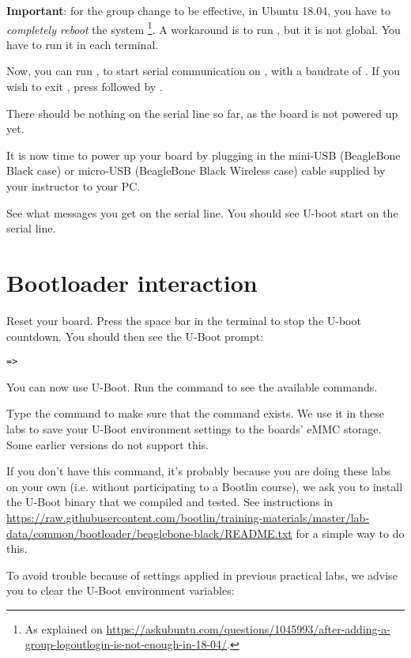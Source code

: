 {\bf Important}: for the group change to be effective, in Ubuntu 18.04, you have to
{\em completely reboot} the system \footnote{As explained on
\url{https://askubuntu.com/questions/1045993/after-adding-a-group-logoutlogin-is-not-enough-in-18-04/}.}.
A workaround is to run , but it is not global.
You have to run it in each terminal.

Now, you can run , to start serial
communication on , with a baudrate of . If
you wish to exit , press \code{[Ctrl][a]} followed by
\code{[Ctrl][x]}.

There should be nothing on the serial line so far, as the board is not
powered up yet.

It is now time to power up your board by plugging in the mini-USB
(BeagleBone Black case) or micro-USB (BeagleBone Black Wireless case)
cable supplied by your instructor to your PC.

See what messages you get on the serial line. You should see U-boot
start on the serial line.

\section{Bootloader interaction}

Reset your board. Press the space bar in the  terminal
to stop the U-boot countdown. You should then see the U-Boot prompt:

\begin{verbatim}
=>
\end{verbatim}

You can now use U-Boot. Run the  command to see the available
commands.

Type the  command to make sure that the
 command exists. We use it in these labs to
save your U-Boot environment settings to the boards' eMMC storage.
Some earlier versions do not support this.

If you don't have this command, it's probably because you are doing these labs on your own
(i.e. without participating to a Bootlin course), we ask you to install the U-Boot binary
that we compiled and tested. See instructions in
\url{https://raw.githubusercontent.com/bootlin/training-materials/master/lab-data/common/bootloader/beaglebone-black/README.txt}
for a simple way to do this.

To avoid trouble because of settings applied in previous practical labs,
we advise you to clear the U-Boot environment variables:

